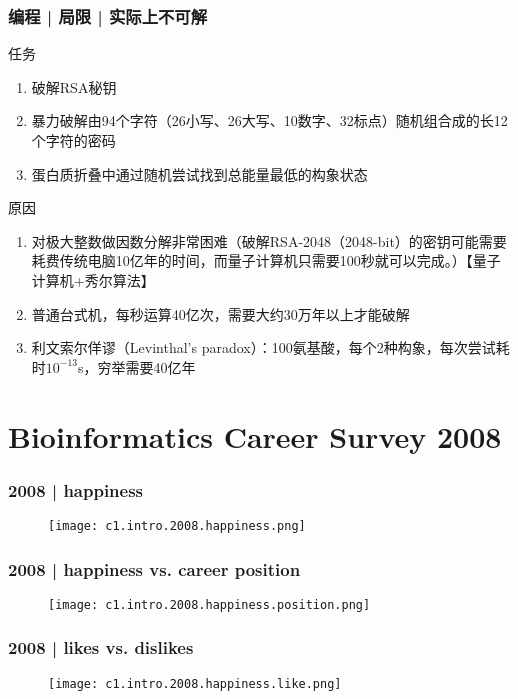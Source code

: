 \begin{frame}
  \frametitle{编程 | 局限 | 实际上不可解}
  \begin{block}{任务}
    \begin{enumerate}
      \item<1-> 破解RSA秘钥
      \item<2-> 暴力破解由94个字符（26小写、26大写、10数字、32标点）随机组合成的长12个字符的密码
      \item<3-> 蛋白质折叠中通过随机尝试找到总能量最低的构象状态
    \end{enumerate}
  \end{block}
  \begin{block}{原因}
    \begin{enumerate}
      \item<1-> 对极大整数做因数分解非常困难（破解RSA-2048（2048-bit）的密钥可能需要耗费传统电脑10亿年的时间，而量子计算机只需要100秒就可以完成。）【量子计算机+秀尔算法】
      \item<2-> 普通台式机，每秒运算40亿次，需要大约30万年以上才能破解
      \item<3-> 利文索尔佯谬（Levinthal's paradox）：100氨基酸，每个2种构象，每次尝试耗时$10^{-13}$s，穷举需要40亿年
    \end{enumerate}
  \end{block}
\end{frame}

\section{Bioinformatics Career Survey 2008}
\begin{frame}
  \frametitle{2008 | happiness}
   \begin{figure}
     \centering
     \texttt{[image: c1.intro.2008.happiness.png]}
   \end{figure} 
\end{frame}

\begin{frame}
  \frametitle{2008 | happiness vs. career position}
   \begin{figure}
     \centering
     \texttt{[image: c1.intro.2008.happiness.position.png]}
   \end{figure} 
\end{frame}

\begin{frame}
  \frametitle{2008 | likes vs. dislikes}
   \begin{figure}
     \centering
     \texttt{[image: c1.intro.2008.happiness.like.png]}
   \end{figure} 
\end{frame}

